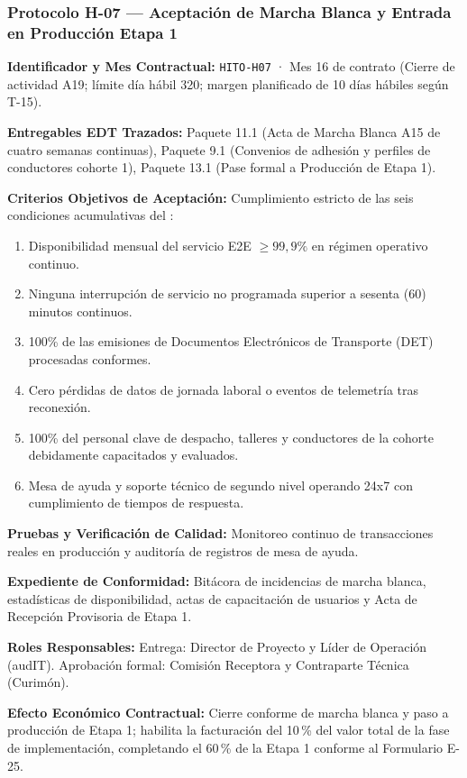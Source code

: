 \subsubsection*{Protocolo H-07 — Aceptación de Marcha Blanca y Entrada en Producción Etapa 1}\label{sec:9-proto-h7}
\par\noindent\textbf{Identificador y Mes Contractual:} \texttt{HITO-H07} · Mes 16 de contrato (Cierre de actividad A19; límite día hábil 320; margen planificado de 10 días hábiles según T-15).\par
\par\noindent\textbf{Entregables EDT Trazados:} Paquete 11.1 (Acta de Marcha Blanca A15 de cuatro semanas continuas), Paquete 9.1 (Convenios de adhesión y perfiles de conductores cohorte 1), Paquete 13.1 (Pase formal a Producción de Etapa 1).\par
\par\noindent\textbf{Criterios Objetivos de Aceptación:} Cumplimiento estricto de las seis condiciones acumulativas del :
\begin{enumerate}
  \item Disponibilidad mensual del servicio E2E $\ge 99,9\%$ en régimen operativo continuo.
  \item Ninguna interrupción de servicio no programada superior a sesenta (60) minutos continuos.
  \item 100\% de las emisiones de Documentos Electrónicos de Transporte (DET) procesadas conformes.
  \item Cero pérdidas de datos de jornada laboral o eventos de telemetría tras reconexión.
  \item 100\% del personal clave de despacho, talleres y conductores de la cohorte debidamente capacitados y evaluados.
  \item Mesa de ayuda y soporte técnico de segundo nivel operando 24x7 con cumplimiento de tiempos de respuesta.
\end{enumerate}
\par\noindent\textbf{Pruebas y Verificación de Calidad:} Monitoreo continuo de transacciones reales en producción y auditoría de registros de mesa de ayuda.\par
\par\noindent\textbf{Expediente de Conformidad:} Bitácora de incidencias de marcha blanca, estadísticas de disponibilidad, actas de capacitación de usuarios y Acta de Recepción Provisoria de Etapa 1.\par
\par\noindent\textbf{Roles Responsables:} Entrega: Director de Proyecto y Líder de Operación (audIT). Aprobación formal: Comisión Receptora y Contraparte Técnica (Curimón).\par
\par\noindent\textbf{Efecto Económico Contractual:} Cierre conforme de marcha blanca y paso a producción de Etapa 1; habilita la facturación del 10\,\% del valor total de la fase de implementación, completando el 60\,\% de la Etapa 1 conforme al Formulario E-25.\par


